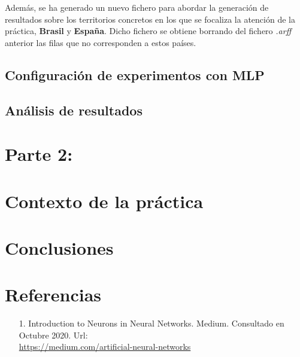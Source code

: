 \documentclass[12pt,a4paper, xcolor=table]{article}
\begin{document}
    Además, se ha generado un nuevo fichero para abordar la generación de resultados sobre los territorios concretos en los que se focaliza la atención de la práctica, \textbf{Brasil} y \textbf{España}. Dicho fichero se obtiene borrando del fichero \textit{.arff} anterior las filas que no corresponden a estos países.

    \subsection{Configuración de experimentos con MLP}

    \subsection{Análisis de resultados}

\section{Parte 2: }

\section{Contexto de la práctica}


 \section{Conclusiones}

\clearpage 

\section{Referencias}
    \begin{itemize}
        \item [1.] Introduction to Neurons in Neural Networks. Medium. Consultado en Octubre 2020. Url: \\
        \href{https://medium.com/artificial-neural-networks/introduction-to-neurons-in-neural-networks-71828d040a65}{https://medium.com/artificial-neural-networks}
    \end{itemize}
\printindex
\end{document}
